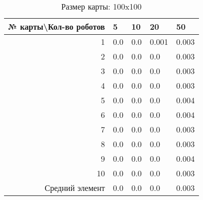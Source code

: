 \begin{table}[H]
\centering
\begin{tabular}{|r|l|l|l|l|}
\hline
№ карты\textbackslash Кол-во роботов & \textbf{5} & \textbf{10} & \textbf{20} & \textbf{50}\\ \hline
1 & 0.0 & 0.0 & 0.001 & 0.003\\ \hline
2 & 0.0 & 0.0 & 0.0 & 0.003\\ \hline
3 & 0.0 & 0.0 & 0.0 & 0.003\\ \hline
4 & 0.0 & 0.0 & 0.0 & 0.003\\ \hline
5 & 0.0 & 0.0 & 0.0 & 0.004\\ \hline
6 & 0.0 & 0.0 & 0.0 & 0.004\\ \hline
7 & 0.0 & 0.0 & 0.0 & 0.003\\ \hline
8 & 0.0 & 0.0 & 0.0 & 0.003\\ \hline
9 & 0.0 & 0.0 & 0.0 & 0.004\\ \hline
10 & 0.0 & 0.0 & 0.0 & 0.003\\ \hline
Средний элемент & 0.0 & 0.0 & 0.0 & 0.003\\ \hline
\end{tabular}
\caption*{Размер карты: 100x100}
\end{table}

